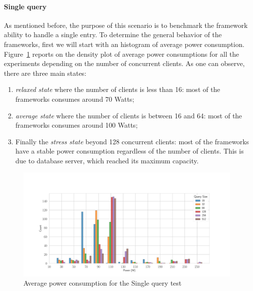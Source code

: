\paragraph{Single query}
As mentioned before, the purpose of this scenario is to benchmark the framework ability to handle a single entry.
To determine the general behavior of the frameworks, first we will start with an histogram of average power consumption.
Figure~\ref{fig:av_power_db} reports on the  density plot of average power consumptions for all the experiments depending on the number of concurrent clients.
As one can observe, there are three main states:
\begin{enumerate}
    \item \emph{relaxed state} where the number of clients is less than 16: most of the frameworks consumes around 70 Watts;
    \item \emph{average state} where the number of clients is between 16 and 64: most of the frameworks consumes around 100 Watts;
    \item Finally the \emph{stress state} beyond 128 concurrent clients: most of the frameworks  have a stable power consumption regardless of the number of clients.
    This is due to database server, which reached its maximum capacity.
\end{enumerate}

\begin{figure}[hbt]
    \centering
    \includegraphics[width=\textwidth,height=\textheight,keepaspectratio]{imgs/histogram_av_power_cpu_db}
    \caption{Average power consumption for the Single query test }
    \label{fig:av_power_db}
\end{figure}

